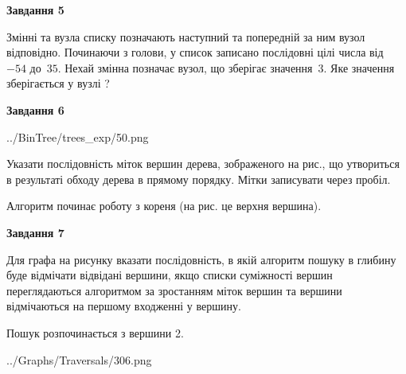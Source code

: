 \documentclass[12pt, ukrainian]{article}
\begin{document}
{\begin {large}
{\begin {center}\textbf{Завдання 5}\end {center}}\par
Змінні  та  вузла списку позначають наступний та попередній за ним вузол відповідно. Починаючи з голови, у список записано послідовні цілі числа від~$-54$ до~$35$. Нехай змінна  позначає вузол, що зберігає значення~$3$.
Яке значення зберігається у вузлі  ?\par
\newpage

{\begin {center}\textbf{Завдання 6}\end {center}}\par

\begin{center}
	{../BinTree/trees_exp/50.png}
\end{center}
Указати послідовність міток вершин дерева, зображеного на рис., що утвориться в результаті обходу дерева в прямому порядку. Мітки записувати через пробіл.\par Алгоритм починає роботу з кореня (на рис. це верхня вершина).\par
\newpage

{\begin {center}\textbf{Завдання 7}\end {center}}\par
Для графа на рисунку вказати послідовність, в якій алгоритм пошуку в глибину буде відмічати відвідані вершини, якщо списки суміжності вершин переглядаються алгоритмом за зростанням міток вершин та вершини відмічаються на першому вход\-женні у вершину.\par
Пошук розпочинається з вершини 2.\par

\begin{center}
	{../Graphs/Traversals/306.png}
\end{center}\par
\newpage


\end{large}}
\end{document}
